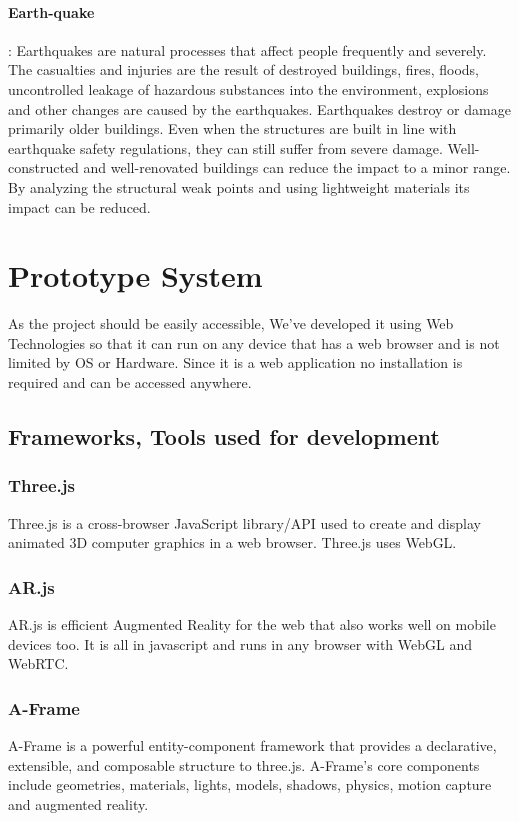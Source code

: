 \documentclass[conference]{IEEEtran}
\begin{document}
\paragraph{Earth-quake}: Earthquakes are natural processes that affect people frequently and severely. The casualties and injuries are the result of destroyed buildings, fires, floods, uncontrolled leakage of hazardous substances into the environment, explosions and other changes are caused by the earthquakes. Earthquakes destroy or damage primarily older buildings. Even when the structures are built in line with earthquake safety regulations, they can still suffer from severe damage. Well-constructed and well-renovated buildings can reduce the impact to a minor range. By analyzing the structural weak points and using lightweight materials its impact can be reduced.

\section{Prototype System}
As the project should be easily accessible, We've developed it using Web Technologies so that it can run on any device that has a web browser and is not limited by OS or Hardware.
Since it is a web application no installation is required and can be accessed anywhere.

\subsection{Frameworks, Tools used for development}
\subsubsection{Three.js} Three.js is a cross-browser JavaScript library/API used to create and display animated 3D computer graphics in a web browser. Three.js uses WebGL.
\subsubsection{AR.js}AR.js is efficient Augmented Reality for the web that also works well on mobile devices too. It is all in javascript and runs in any browser with WebGL and WebRTC. 
\subsubsection{A-Frame} A-Frame is a powerful entity-component framework that provides a declarative, extensible, and composable structure to three.js.
A-Frame’s core components include geometries, materials, lights, models, shadows, physics, motion capture and augmented reality.
\end{document}
